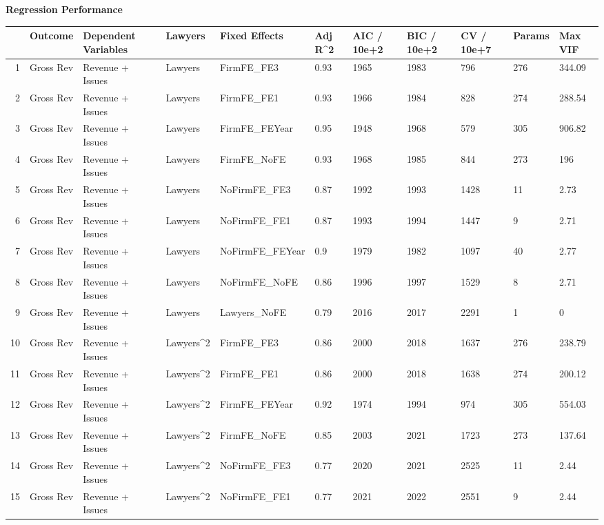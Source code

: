 \documentclass{article}
\begin{document}
\newpage
{\large \textbf{Regression Performance} }%
\begin{table}[H]
\centering
\begin{tabular}{rllllllllll}
  \hline
 & Outcome & Dependent Variables & Lawyers & Fixed Effects & Adj R^2 & AIC / 10e+2 & BIC / 10e+2 & CV / 10e+7 & Params & Max VIF \\ 
  \hline
1 & Gross Rev & Revenue + Issues & Lawyers & FirmFE\_FE3 & 0.93 & 1965 & 1983 & 796 & 276 & 344.09 \\ 
  2 & Gross Rev & Revenue + Issues & Lawyers & FirmFE\_FE1 & 0.93 & 1966 & 1984 & 828 & 274 & 288.54 \\ 
  3 & Gross Rev & Revenue + Issues & Lawyers & FirmFE\_FEYear & 0.95 & 1948 & 1968 & 579 & 305 & 906.82 \\ 
  4 & Gross Rev & Revenue + Issues & Lawyers & FirmFE\_NoFE & 0.93 & 1968 & 1985 & 844 & 273 & 196 \\ 
  5 & Gross Rev & Revenue + Issues & Lawyers & NoFirmFE\_FE3 & 0.87 & 1992 & 1993 & 1428 & 11 & 2.73 \\ 
  6 & Gross Rev & Revenue + Issues & Lawyers & NoFirmFE\_FE1 & 0.87 & 1993 & 1994 & 1447 & 9 & 2.71 \\ 
  7 & Gross Rev & Revenue + Issues & Lawyers & NoFirmFE\_FEYear & 0.9 & 1979 & 1982 & 1097 & 40 & 2.77 \\ 
  8 & Gross Rev & Revenue + Issues & Lawyers & NoFirmFE\_NoFE & 0.86 & 1996 & 1997 & 1529 & 8 & 2.71 \\ 
  9 & Gross Rev & Revenue + Issues & Lawyers & Lawyers\_NoFE & 0.79 & 2016 & 2017 & 2291 & 1 & 0 \\ 
  10 & Gross Rev & Revenue + Issues & Lawyers^2 & FirmFE\_FE3 & 0.86 & 2000 & 2018 & 1637 & 276 & 238.79 \\ 
  11 & Gross Rev & Revenue + Issues & Lawyers^2 & FirmFE\_FE1 & 0.86 & 2000 & 2018 & 1638 & 274 & 200.12 \\ 
  12 & Gross Rev & Revenue + Issues & Lawyers^2 & FirmFE\_FEYear & 0.92 & 1974 & 1994 & 974 & 305 & 554.03 \\ 
  13 & Gross Rev & Revenue + Issues & Lawyers^2 & FirmFE\_NoFE & 0.85 & 2003 & 2021 & 1723 & 273 & 137.64 \\ 
  14 & Gross Rev & Revenue + Issues & Lawyers^2 & NoFirmFE\_FE3 & 0.77 & 2020 & 2021 & 2525 & 11 & 2.44 \\ 
  15 & Gross Rev & Revenue + Issues & Lawyers^2 & NoFirmFE\_FE1 & 0.77 & 2021 & 2022 & 2551 & 9 & 2.44 \\ 

\end{tabular}
\end{table}
\end{document}
